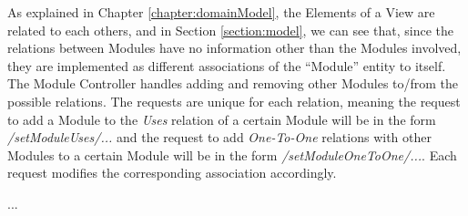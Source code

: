 As explained in Chapter \ref{chapter:domainModel}, the Elements of a View are related to each others, and in Section \ref{section:model}, we can see that, since the relations between Modules have no information other than the Modules involved, they are implemented as different associations of the ``Module'' entity to itself. The Module Controller handles adding and removing other Modules to/from the possible relations. The requests are unique for each relation, meaning the request to add a Module to the \textit{Uses} relation of a certain Module will be in the form \textit{/setModuleUses/...} and the request to add \textit{One-To-One} relations with other Modules to a certain Module will be in the form \textit{/setModuleOneToOne/...}. Each request modifies the corresponding association accordingly. 

...
 
